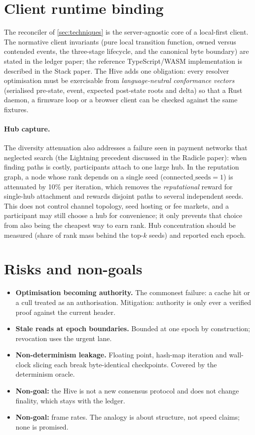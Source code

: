 \documentclass[a4paper,11pt,twoside,parskip=half-,headings=small]{scrartcl}
\begin{document}
\section{Client runtime binding}
\label{sec:client}
The reconciler of \cref{sec:techniques} is the server-agnostic core of a local-first client. The normative client invariants (pure local transition function, owned versus contended events, the three-stage lifecycle, and the canonical byte boundary) are stated in the ledger paper; the reference TypeScript/WASM implementation is described in the Stack paper. The Hive adds one obligation: every resolver optimisation must be exercisable from \emph{language-neutral conformance vectors} (serialised pre-state, event, expected post-state roots and delta) so that a Rust daemon, a firmware loop or a browser client can be checked against the same fixtures.

\paragraph{Hub capture.} The diversity attenuation also addresses a failure seen in payment networks that neglected search (the Lightning precedent discussed in the Radicle paper): when finding paths is costly,
participants attach to one large hub. In the reputation graph, a node whose rank depends on a single seed ($\text{connected\_seeds}=1$) is attenuated by 10\% per iteration, which removes the \emph{reputational} reward for
single-hub attachment and rewards disjoint paths to several independent seeds. This does not control channel topology, seed hosting or fee markets, and a participant may still choose a hub for
convenience; it only prevents that choice from also being the cheapest way to earn rank. Hub concentration should be measured (share of rank mass behind the top-$k$ seeds) and reported each epoch.

\section{Risks and non-goals}
\label{sec:risks}
\begin{itemize}
  \item \textbf{Optimisation becoming authority.} The commonest failure: a cache hit or a cull treated as an authorisation. Mitigation: authority is only ever a verified proof against the current header.
  \item \textbf{Stale reads at epoch boundaries.} Bounded at one epoch by construction; revocation uses the urgent lane.
  \item \textbf{Non-determinism leakage.} Floating point, hash-map iteration and wall-clock slicing each break byte-identical checkpoints. Covered by the determinism oracle.
  \item \textbf{Non-goal:} the Hive is not a new consensus protocol and does not change finality, which stays with the ledger.
  \item \textbf{Non-goal:} frame rates. The analogy is about structure, not speed claims; none is promised.
\end{itemize}
\end{document}
